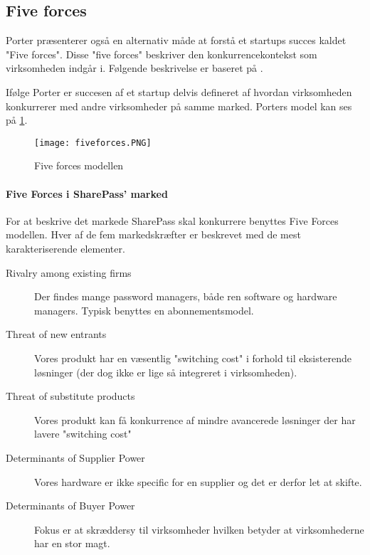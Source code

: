 \subsection{Five forces}
 Porter præsenterer også en alternativ måde at forstå et startups succes kaldet "Five forces".
 Disse "five forces" beskriver den konkurrencekontekst som virksomheden indgår i.
 Følgende beskrivelse er baseret på \citet[p.~16]{rose2012software}.

 Ifølge Porter er succesen af et startup delvis defineret af hvordan virksomheden konkurrerer med andre virksomheder på samme marked.
 Porters model kan ses på \cref{fiveforces}.

\begin{figure}
	\texttt{[image: fiveforces.PNG]}
	\caption{Five forces modellen}
	\label{fiveforces}
\end{figure}

\paragraph{Five Forces i SharePass' marked} %
\label{par:five_forces_i_sharepass_marked}

For at beskrive det markede SharePass skal konkurrere benyttes Five Forces modellen. 
Hver af de fem markedskræfter er beskrevet med de mest karakteriserende elementer.

\begin{description}
	\item[Rivalry among existing firms] Der findes mange password managers, både ren software og hardware managers. Typisk benyttes en abonnementsmodel.
	\item[Threat of new entrants] Vores produkt har en væsentlig "switching cost" i forhold til eksisterende løsninger (der dog ikke er lige så integreret i virksomheden). 
	\item [Threat of substitute products] Vores produkt kan få konkurrence af mindre avancerede løsninger der har lavere "switching cost"
	\item [Determinants of Supplier Power] Vores hardware er ikke specific for en supplier og det er derfor let at skifte. 
	\item [Determinants of Buyer Power] Fokus er at skræddersy til virksomheder hvilken betyder at virksomhederne har en stor magt.
\end{description}

